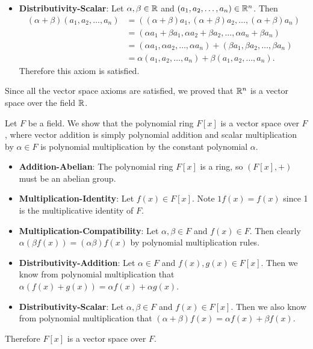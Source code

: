 \begin{example}
\begin{itemize}
        \item \textbf{Distributivity-Scalar}: Let $\alpha, \beta \in \mathbb{R}$ and $(a_1, a_2, \dots, a_n) \in \mathbb{R}^n$. Then
        \begin{align*}
            (\alpha+\beta)(a_1, a_2, \dots, a_n) &= ((\alpha+\beta)a_1, (\alpha+\beta)a_2, \dots, (\alpha+\beta)a_n)\\
            &= (\alpha a_1 + \beta a_1, \alpha a_2 + \beta a_2, \dots, \alpha a_n + \beta a_n)\\
            &= (\alpha a_1, \alpha a_2, \dots, \alpha a_n) + (\beta a_1, \beta a_2, \dots, \beta a_n)\\
            &= \alpha(a_1, a_2, \dots, a_n) + \beta(a_1, a_2, \dots, a_n).
        \end{align*}
        Therefore this axiom is satisfied.
    \end{itemize}

    Since all the vector space axioms are satisfied, we proved that $\mathbb{R}^n$ is a vector space over the field $\mathbb{R}$.
\end{example}

\begin{example}\label{example-polynomial-ring-over-field-is-vector-space}
    Let $F$ be a field. We show that the polynomial ring $F[x]$ is a vector space over $F$, where vector addition is simply polynomial addition and scalar multiplication by $\alpha \in F$ is polynomial multiplication by the constant polynomial $\alpha$.
    \begin{itemize}
        \item \textbf{Addition-Abelian}: The polynomial ring $F[x]$ is a ring, so $(F[x], +)$ must be an abelian group.

        \item \textbf{Multiplication-Identity}: Let $f(x) \in F[x]$. Note $1f(x) = f(x)$ since 1 is the multiplicative identity of $F$.

        \item \textbf{Multiplication-Compatibility}: Let $\alpha, \beta \in F$ and $f(x) \in F$. Then clearly $\alpha(\beta f(x)) = (\alpha\beta)f(x)$ by polynomial multiplication rules.

        \item \textbf{Distributivity-Addition}: Let $\alpha \in F$ and $f(x), g(x) \in F[x]$. Then we know from polynomial multiplication that $\alpha(f(x) + g(x)) = \alpha f(x) + \alpha g(x)$.

        \item \textbf{Distributivity-Scalar}: Let $\alpha, \beta \in F$ and $f(x) \in F[x]$. Then we also know from polynomial multiplication that $(\alpha+\beta)f(x) = \alpha f(x) + \beta f(x)$.
    \end{itemize}
    Therefore $F[x]$ is a vector space over $F$.
\end{example}

